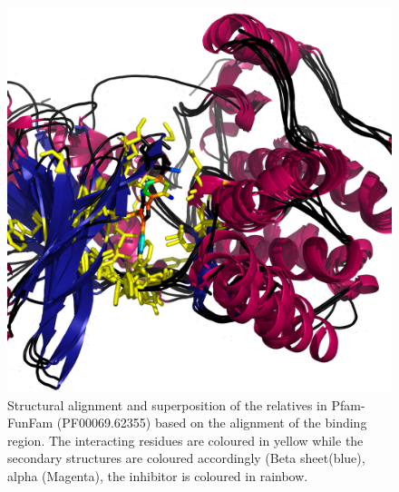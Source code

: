 \documentclass[a4paper, 11pt]{article}
\begin{document}
\begin{figure}[H]
	\includegraphics[width=.8\linewidth]{figures/superpose_4use.png}
	\centering
	\caption{Structural alignment and superposition of the relatives in Pfam-FunFam (PF00069.62355) based on the alignment of the binding region. The interacting residues are coloured in yellow while the secondary structures are coloured accordingly (Beta sheet(blue), alpha (Magenta), the inhibitor is coloured in rainbow.}
	\label{struct_align}
\end{figure}
\end{document}
